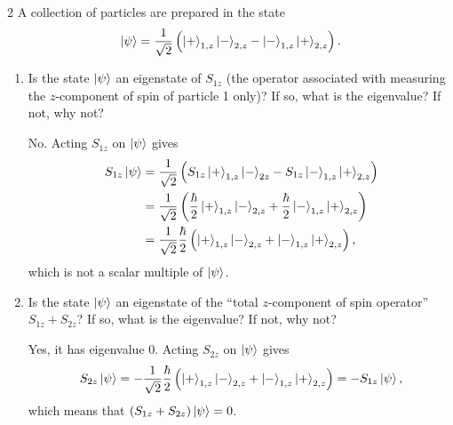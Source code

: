 \documentclass[11pt]{article}
\begin{document}
\begin{problem}{2}
  A collection of particles are prepared in the state
  \begin{equation}
    \label{eq:p2-state}
    \ket{\psi} = \frac{1}{\sqrt{2}}\left(
      \ket{+}_{1,z}\ket{-}_{2,z} - \ket{-}_{1,z}\ket{+}_{2,z}
    \right).
  \end{equation}
  \begin{enumerate}[label=(\alph*)]
    \item Is the state \(\ket{\psi}\) an eigenstate of \(S_{1z}\) (the operator associated with measuring the \(z\)-component of spin of particle 1 only)?
          If so, what is the eigenvalue? If not, why not?
          \begin{answer}
            No.
            Acting \( S_{1z} \) on \( \ket{\psi} \) gives
            \begin{equation}
            \label{eq:2}
            \begin{aligned}
              S_{1z}\ket{\psi} &= \frac{1}{\sqrt{2}} \left( S_{1z}\ket{+}_{1,z}\ket{-}_{2z} - S_{1z}\ket{-}_{1,z}\ket{+}_{2,z} \right) \\
                            &= \frac{1}{\sqrt{2}} \left( \frac{\hbar}{2}\ket{+}_{1,z}\ket{-}_{2,z} + \frac{\hbar}{2}\ket{-}_{1,z}\ket{+}_{2,z} \right) \\
                            &= \frac{1}{\sqrt{2}} \frac{\hbar}{2} \left( \ket{+}_{1,z}\ket{-}_{2,z} + \ket{-}_{1,z}\ket{+}_{2,z} \right),
            \end{aligned}
          \end{equation}
          which is not a scalar multiple of \( \ket{\psi} \).
          \end{answer}
    \item Is the state \(\ket{\psi}\) an eigenstate of the ``total \(z\)-component of spin operator'' \(S_{1z}+S_{2z}\)?
          If so, what is the eigenvalue? If not, why not?
          \begin{answer}
            Yes, it has eigenvalue \( 0 \). Acting \( S_{2z} \) on \( \ket{\psi} \) gives
            \begin{equation}
              S_{2z}\ket{\psi} = -\frac{1}{\sqrt{2}} \frac{\hbar}{2} \left( \ket{+}_{1,z}\ket{-}_{2,z} + \ket{-}_{1,z}\ket{+}_{2,z}  \right) = -S_{1z}\ket{\psi},
            \end{equation}
            which means that \( (S_{1z} + S_{2z})\ket{\psi} = 0 \).
          \end{answer}
  \end{enumerate}

\end{problem}
\end{document}

